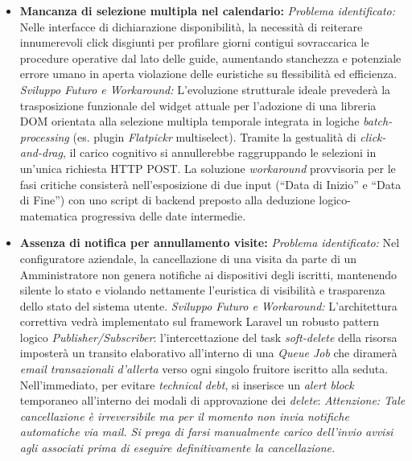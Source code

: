 \begin{itemize}
    \item \textbf{Mancanza di selezione multipla nel calendario:}
    \newline\textit{Problema identificato:} Nelle interfacce di dichiarazione disponibilità, la necessità di reiterare innumerevoli click disgiunti per profilare giorni contigui sovraccarica le procedure operative dal lato delle guide, aumentando stanchezza e potenziale errore umano in aperta violazione delle euristiche su flessibilità ed efficienza.
    \newline\textit{Sviluppo Futuro e Workaround:} L'evoluzione strutturale ideale prevederà la trasposizione funzionale del widget attuale per l'adozione di una libreria DOM orientata alla selezione multipla temporale integrata in logiche \textit{batch-processing} (es. plugin \textit{Flatpickr} multiselect). Tramite la gestualità di \textit{click-and-drag}, il carico cognitivo si annullerebbe raggruppando le selezioni in un'unica richiesta HTTP POST. La soluzione \textit{workaround} provvisoria per le fasi critiche consisterà nell'esposizione di due input (``Data di Inizio'' e ``Data di Fine'') con uno script di backend preposto alla deduzione logico-matematica progressiva delle date intermedie.

    \item \textbf{Assenza di notifica per annullamento visite:}
    \newline\textit{Problema identificato:} Nel configuratore aziendale, la cancellazione di una visita da parte di un Amministratore non genera notifiche ai dispositivi degli iscritti, mantenendo silente lo stato e violando nettamente l'euristica di visibilità e trasparenza dello stato del sistema utente.
    \newline\textit{Sviluppo Futuro e Workaround:} L'architettura correttiva vedrà implementato sul framework Laravel un robusto pattern logico \textit{Publisher/Subscriber}: l'intercettazione del task \textit{soft-delete} della risorsa imposterà un transito elaborativo all'interno di una \textit{Queue Job} che diramerà \textit{email transazionali d'allerta} verso ogni singolo fruitore iscritto alla seduta. Nell'immediato, per evitare \textit{technical debt}, si inserisce un \textit{alert block} temporaneo all'interno dei modali di approvazione dei \textit{delete}: \textit{\guillemotleft Attenzione: Tale cancellazione è irreversibile ma per il momento non invia notifiche automatiche via mail. Si prega di farsi manualmente carico dell'invio avvisi agli associati prima di eseguire definitivamente la cancellazione.\guillemotright}
\end{itemize}
